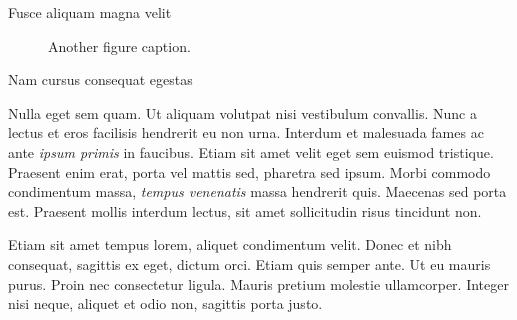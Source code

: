 \documentclass[final]{beamer}
\newlength{\colwidth}
\begin{document}
\begin{frame}[t]
\begin{columns}[t]
\begin{column}{\colwidth}
\begin{block}{Fusce aliquam magna velit}
                    \begin{figure}
                        \centering
                        \caption{Another figure caption.}
                    \end{figure}

                \end{block}

                \begin{block}{Nam cursus consequat egestas}

                    Nulla eget sem quam. Ut aliquam volutpat nisi vestibulum convallis. Nunc a
                    lectus et eros facilisis hendrerit eu non urna. Interdum et malesuada fames
                    ac ante \textit{ipsum primis} in faucibus. Etiam sit amet velit eget sem
                    euismod tristique. Praesent enim erat, porta vel mattis sed, pharetra sed
                    ipsum. Morbi commodo condimentum massa, \textit{tempus venenatis} massa
                    hendrerit quis. Maecenas sed porta est. Praesent mollis interdum lectus,
                    sit amet sollicitudin risus tincidunt non.

                    Etiam sit amet tempus lorem, aliquet condimentum velit. Donec et nibh
                    consequat, sagittis ex eget, dictum orci. Etiam quis semper ante. Ut eu
                    mauris purus. Proin nec consectetur ligula. Mauris pretium molestie
                    ullamcorper. Integer nisi neque, aliquet et odio non, sagittis porta justo.


\end{block}
\end{column}
\end{columns}
\end{frame}
\end{document}
